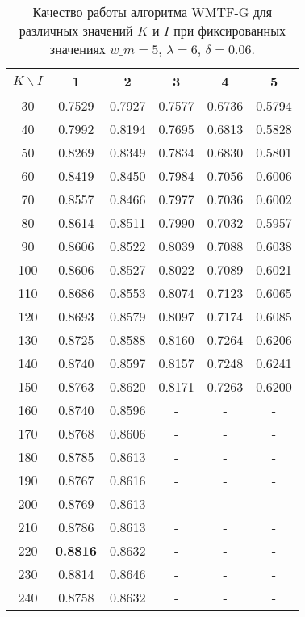    \begin{table}[ht!]
        \caption{Качество работы алгоритма WMTF-G для различных значений $K$ и $I$ при фиксированных значениях $w\_m=5$, $\lambda=6$, $\delta=0.06$. \bigskip}
        \centering
        \label{tabular:wtmfg_test5}
        \begin{tabular}{|c|c|c|c|c|c|} \hline
            $K \backslash I$ & 1 & 2 & 3 & 4 & 5  \\ \hline
            30 & 0.7529 & 0.7927 & 0.7577 & 0.6736 & 0.5794  \\ \hline
            40 & 0.7992 & 0.8194 & 0.7695 & 0.6813 & 0.5828  \\ \hline
            50 & 0.8269 & 0.8349 & 0.7834 & 0.6830 & 0.5801  \\ \hline
            60 & 0.8419 & 0.8450 & 0.7984 & 0.7056 & 0.6006  \\ \hline
            70 & 0.8557 & 0.8466 & 0.7977 & 0.7036 & 0.6002  \\ \hline
            80 & 0.8614 & 0.8511 & 0.7990 & 0.7032 & 0.5957  \\ \hline
            90 & 0.8606 & 0.8522 & 0.8039 & 0.7088 & 0.6038  \\ \hline
            100 & 0.8606 & 0.8527 & 0.8022 & 0.7089 & 0.6021  \\ \hline
            110 & 0.8686 & 0.8553 & 0.8074 & 0.7123 & 0.6065  \\ \hline
            120 & 0.8693 & 0.8579 & 0.8097 & 0.7174 & 0.6085  \\ \hline
            130 & 0.8725 & 0.8588 & 0.8160 & 0.7264 & 0.6206  \\ \hline
            140 & 0.8740 & 0.8597 & 0.8157 & 0.7248 & 0.6241  \\ \hline
            150 & 0.8763 & 0.8620 & 0.8171 & 0.7263 & 0.6200  \\ \hline
            160 & 0.8740 & 0.8596 & - & - & - \\ \hline
            170 & 0.8768 & 0.8606 & - & - & -  \\ \hline
            180 & 0.8785 & 0.8613 & - & - & -  \\ \hline
            190 & 0.8767 & 0.8616 & - & - & -  \\ \hline
            200 & 0.8769 & 0.8613 & - & - & -  \\ \hline
            210 & 0.8786 & 0.8613 & - & - & -  \\ \hline
            220 & \bf{0.8816} & 0.8632 & - & - & -  \\ \hline
            230 & 0.8814 & 0.8646 & - & - & -  \\ \hline
            240 & 0.8758 & 0.8632 & - & - & -  \\ \hline
        \end{tabular}
    \end{table}

